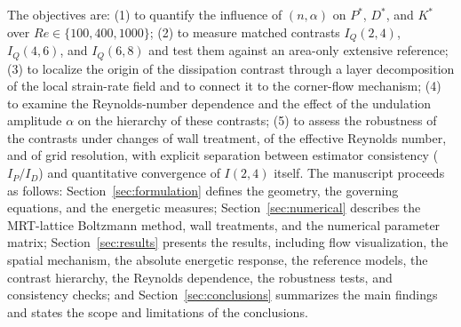 The objectives are: (1) to quantify the influence of $(n,\alpha)$ on $P^*$, $D^*$, and $K^*$ over $Re\in\{100,400,1000\}$; (2) to measure matched contrasts $I_Q(2,4)$, $I_Q(4,6)$, and $I_Q(6,8)$ and test them against an area-only extensive reference; (3) to localize the origin of the dissipation contrast through a layer decomposition of the local strain-rate field and to connect it to the corner-flow mechanism; (4) to examine the Reynolds-number dependence and the effect of the undulation amplitude $\alpha$ on the hierarchy of these contrasts; (5) to assess the robustness of the contrasts under changes of wall treatment, of the effective Reynolds number, and of grid resolution, with explicit separation between estimator consistency ($I_P/I_D$) and quantitative convergence of $I(2,4)$ itself. The manuscript proceeds as follows: Section~\ref{sec:formulation} defines the geometry, the governing equations, and the energetic measures; Section~\ref{sec:numerical} describes the MRT-lattice Boltzmann method, wall treatments, and the numerical parameter matrix; Section~\ref{sec:results} presents the results, including flow visualization, the spatial mechanism, the absolute energetic response, the reference models, the contrast hierarchy, the Reynolds dependence, the robustness tests, and consistency checks; and Section~\ref{sec:conclusions} summarizes the main findings and states the scope and limitations of the conclusions.
